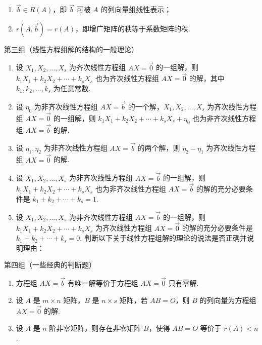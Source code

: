 \begin{enumerate}
\begin{enumerate}[resume*]
\begin{enumerate}
                        \item $\vec{b} \in R(A)$，即 $\vec{b}$ 可被 $A$ 的列向量组线性表示；

                        \item $r(A,\vec{b})=r(A)$，即增广矩阵的秩等于系数矩阵的秩.
                    \end{enumerate}
          \end{enumerate}

          第三组（线性方程组解的结构的一般理论）
          \begin{enumerate}[resume*]
              \item 设 $X_1,X_2,\ldots,X_s$ 为齐次线性方程组 $AX=\vec{0}$ 的一组解，则 $k_1X_1+k_2X_2+\cdots+k_sX_s$ 也为齐次线性方程组 $AX=\vec{0}$ 的解，其中 $k_1,k_2,\ldots,k_s$ 为任意常数.

              \item 设 $\eta_0$ 为非齐次线性方程组 $AX=\vec{b}$ 的一个解，$X_1,X_2,\ldots,X_s$ 为齐次线性方程组 $AX=\vec{0}$ 的一组解，则 $k_1X_1+k_2X_2+\cdots+k_sX_s+\eta_0$ 也为非齐次线性方程组 $AX=\vec{b}$ 的解.

              \item 设 $\eta_1,\eta_2$ 为非齐次线性方程组 $AX=\vec{b}$ 的两个解，则 $\eta_2-\eta_1$ 为齐次线性方程组 $AX=\vec{0}$ 的解.

              \item 设 $X_1,X_2,\ldots,X_s$ 为非齐次线性方程组 $AX=\vec{b}$ 的一组解，则 $k_1X_1+k_2X_2+\cdots+k_sX_s$ 也为非齐次线性方程组 $AX=\vec{b}$ 的解的充分必要条件是 $k_1+k_2+\cdots+k_s=1$.

              \item 设 $X_1,X_2,\ldots,X_s$ 为非齐次线性方程组 $AX=\vec{b}$ 的一组解，则 $k_1X_1+k_2X_2+\cdots+k_sX_s$ 为齐次线性方程组 $AX=\vec{0}$ 的解的充分必要条件是 $k_1+k_2+\cdots+k_s=0$. 判断以下关于线性方程组解的理论的说法是否正确并说明理由：
          \end{enumerate}

          第四组（一些经典的判断题）
          \begin{enumerate}[resume*]
              \item 方程组 $AX=\vec{b}$ 有唯一解等价于方程组 $AX=\vec{0}$ 只有零解.

              \item 设 $A$ 是 $m \times n$ 矩阵，$B$ 是 $n \times s$ 矩阵，若 $AB=O$，则 $B$ 的列向量为方程组 $AX=\vec{0}$ 的解.

              \item 设 $A$ 是 $n$ 阶非零矩阵，则存在非零矩阵 $B$，使得 $AB=O$ 等价于 $r(A)<n$.


\end{enumerate}
\end{enumerate}
